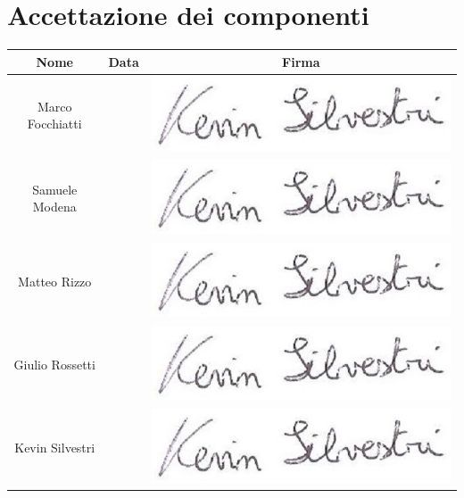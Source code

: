 \documentclass[./PianodiProgetto.tex]{subfiles}
\begin{document}
\section{Accettazione dei componenti}
\begin{table}[H]
	\centering
	\begin{tabular}{|c|c|c|}
		\hline
		Nome&Data&Firma \\ \hline
		Marco Focchiatti& \@date &\includegraphics[scale=0.5]{img/firme/SilvestriKevin} \\ \hline
		Samuele Modena& \@date &\includegraphics[scale=0.5]{img/firme/SilvestriKevin} \\ \hline
		Matteo Rizzo& \@date &\includegraphics[scale=0.5]{img/firme/SilvestriKevin} \\ \hline
		Giulio Rossetti& \@date &\includegraphics[scale=0.5]{img/firme/SilvestriKevin} \\ \hline
		Kevin Silvestri& \@date &\includegraphics[scale=0.5]{img/firme/SilvestriKevin} \\ \hline

\end{tabular}
\end{table}
\end{document}
